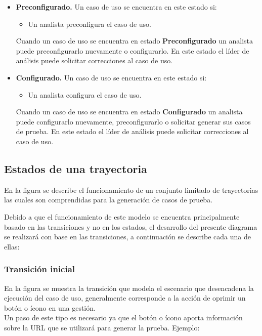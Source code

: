 \begin{itemize}
 \item {\bf Preconfigurado.} Un caso de uso se encuentra en este estado si:
  \begin{itemize}
   \item Un analista preconfigura el caso de uso.
  \end{itemize}
  
  Cuando un caso de uso se encuentra en estado {\bf Preconfigurado} un analista puede preconfigurarlo nuevamente o configurarlo. En este estado el líder de análisis puede solicitar correcciones al caso de uso.

 \item {\bf Configurado.} Un caso de uso se encuentra en este estado si:
  \begin{itemize}
   \item Un analista configura el caso de uso.
  \end{itemize}
  
  Cuando un caso de uso se encuentra en estado {\bf Configurado} un analista puede configurarlo nuevamente, preconfigurarlo o solicitar generar sus casos de prueba. En este estado el líder de análisis puede solicitar correcciones al caso de uso.


\end{itemize}


\subsection{Estados de una trayectoria}
En la figura  se describe el funcionamiento de un conjunto limitado de trayectorias las cuales son comprendidas para la generación de casos de prueba.


Debido a que el funcionamiento de este modelo se encuentra principalmente basado en las transiciones y no en los estados, el desarrollo del presente diagrama se realizará con base en las transiciones, a continuación se describe cada una de ellas:\\

\subsubsection{Transición inicial}  
En la figura  se muestra la transición que modela el escenario que desencadena la ejecución del caso de uso, generalmente corresponde a la acción de oprimir un botón o ícono en una gestión. \\
Un paso de este tipo es necesario ya que el botón o ícono aporta información sobre la URL que se utilizará para generar la prueba. Ejemplo:\\

